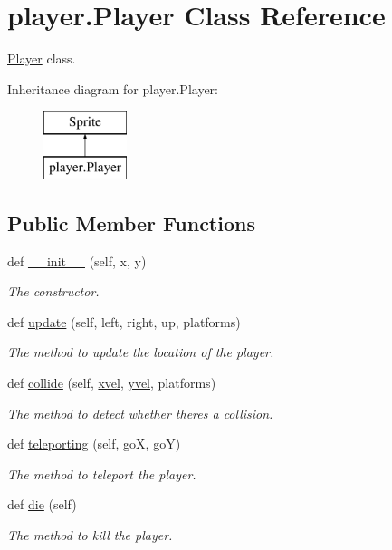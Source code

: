 \hypertarget{classplayer_1_1_player}{}\section{player.\+Player Class Reference}
\label{classplayer_1_1_player}


\hyperlink{classplayer_1_1_player}{Player} class.  


Inheritance diagram for player.\+Player\+:\begin{figure}[H]
\begin{center}
\leavevmode
\includegraphics[height=2.000000cm]{classplayer_1_1_player}
\end{center}
\end{figure}
\subsection*{Public Member Functions}
\begin{DoxyCompactItemize}
\item 
def \hyperlink{classplayer_1_1_player_a52434c87f8baf931655ff9811c57f288}{\+\_\+\+\_\+init\+\_\+\+\_\+} (self, x, y)
\begin{DoxyCompactList}\small\item\em The constructor. \end{DoxyCompactList}\item 
def \hyperlink{classplayer_1_1_player_ad2ac60cf460239c12977eda3acc99d0c}{update} (self, left, right, up, platforms)
\begin{DoxyCompactList}\small\item\em The method to update the location of the player. \end{DoxyCompactList}\item 
def \hyperlink{classplayer_1_1_player_aaab39aa7f4e9fbb17207cd584641d7e0}{collide} (self, \hyperlink{classplayer_1_1_player_ae073642fcdedce9559f717e60945e51f}{xvel}, \hyperlink{classplayer_1_1_player_a91226d0b71959f0a35b280c6e2774e2d}{yvel}, platforms)
\begin{DoxyCompactList}\small\item\em The method to detect whether there\textquotesingle{}s a collision. \end{DoxyCompactList}\item 
def \hyperlink{classplayer_1_1_player_a6ad207dfcfeabddc8fb8e59dca09aa8e}{teleporting} (self, goX, goY)
\begin{DoxyCompactList}\small\item\em The method to teleport the player. \end{DoxyCompactList}\item 
def \hyperlink{classplayer_1_1_player_ac230f41f1580c1a884799af9fd199b34}{die} (self)
\begin{DoxyCompactList}\small\item\em The method to kill the player. \end{DoxyCompactList}\end{DoxyCompactItemize}
